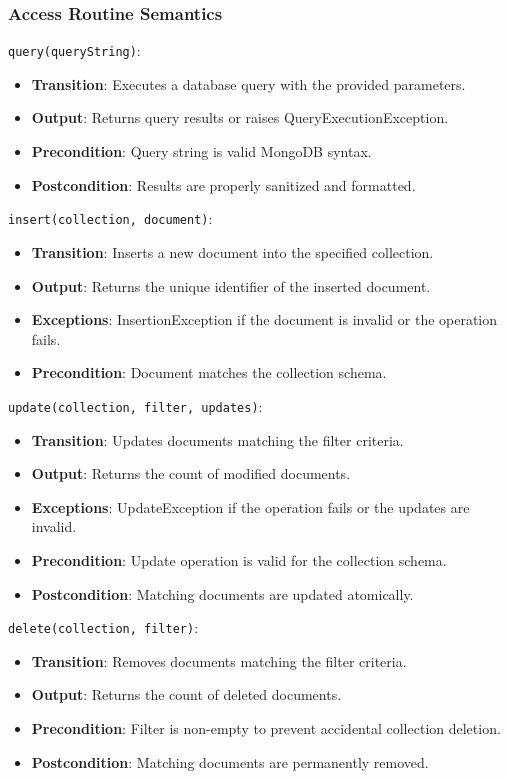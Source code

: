 \documentclass[12pt, titlepage]{article}
\begin{document}
\subsubsection{Access Routine Semantics}
\noindent \texttt{query(queryString)}:
\begin{itemize}
    \item \textbf{Transition}: Executes a database query with the provided parameters.
    \item \textbf{Output}: Returns query results or raises QueryExecutionException.
    \item \textbf{Precondition}: Query string is valid MongoDB syntax.
    \item \textbf{Postcondition}: Results are properly sanitized and formatted.
\end{itemize}

\noindent \texttt{insert(collection, document)}:
\begin{itemize}
    \item \textbf{Transition}: Inserts a new document into the specified collection.
    \item \textbf{Output}: Returns the unique identifier of the inserted document.
    \item \textbf{Exceptions}: InsertionException if the document is invalid or the operation fails.
    \item \textbf{Precondition}: Document matches the collection schema.
\end{itemize}

\noindent \texttt{update(collection, filter, updates)}:
\begin{itemize}
    \item \textbf{Transition}: Updates documents matching the filter criteria.
    \item \textbf{Output}: Returns the count of modified documents.
    \item \textbf{Exceptions}: UpdateException if the operation fails or the updates are invalid.
    \item \textbf{Precondition}: Update operation is valid for the collection schema.
    \item \textbf{Postcondition}: Matching documents are updated atomically.
\end{itemize}

\noindent \texttt{delete(collection, filter)}:
\begin{itemize}
    \item \textbf{Transition}: Removes documents matching the filter criteria.
    \item \textbf{Output}: Returns the count of deleted documents.
    \item \textbf{Precondition}: Filter is non-empty to prevent accidental collection deletion.
    \item \textbf{Postcondition}: Matching documents are permanently removed.
\end{itemize}
\end{document}
